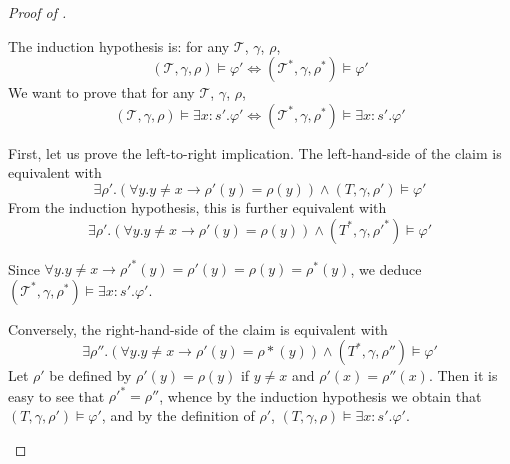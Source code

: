 \begin{proof}[Proof of ]
\begin{itemize}
    The induction hypothesis is: for any $\mathcal{T}$, $\gamma$, $\rho$, 
        $$(\mathcal{T}, \gamma, \rho) \vDash \varphi' \iff (\mathcal{T}^*, \gamma, \rho^\ast) \vDash \varphi'$$
    We want to prove that for any $\mathcal{T}$, $\gamma$, $\rho$, 
        $$(\mathcal{T}, \gamma, \rho) \vDash \exists x:s'. \varphi' \iff (\mathcal{T}^*, \gamma, \rho^\ast) \vDash \exists x:s'.\varphi'$$
    
    First, let us prove the left-to-right implication.
    The left-hand-side of the claim is equivalent with
    $$\exists \rho'. (\forall y. y \neq x \to \rho'(y) = \rho(y)) \wedge (T, \gamma, \rho') \vDash \varphi'$$
    From the induction hypothesis, this is further equivalent with
    $$\exists \rho'. (\forall y. y \neq x \to \rho'(y) = \rho(y)) \wedge (T^\ast, \gamma, {\rho'}^\ast) \vDash \varphi'$$
    
    Since $\forall y. y \neq x \to {\rho'}^\ast(y) = \rho'(y) = \rho(y) = \rho^\ast(y)$, we deduce $(\mathcal{T}^*, \gamma, \rho^\ast) \vDash \exists x:s'.\varphi'$.
    
    Conversely, the right-hand-side of the claim is equivalent with
    $$\exists \rho''. (\forall y. y \neq x \to \rho'(y) = \rho\ast(y)) \wedge (T^\ast, \gamma, \rho'') \vDash \varphi'$$
    Let $\rho'$ be defined by $\rho'(y) = \rho(y)$ if $y\neq x$ and $\rho'(x) = \rho''(x)$. Then it is
    easy to see that ${\rho'}^\ast = \rho''$, whence by the induction hypothesis we obtain that
    $(T, \gamma, \rho') \vDash \varphi'$, and by the definition of $\rho'$, $(T, \gamma, \rho) \vDash \exists x:s'. \varphi'$.
 \end{itemize}
\end{proof}

